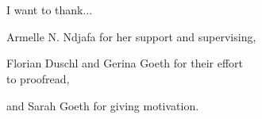 \chapter*{}
\begin{large}
\begin{em}

I want to thank...

\begin{addmargin}[4em]{1em}

Armelle N. Ndjafa for her support and supervising,

Florian Duschl and Gerina Goeth for their effort\\ to proofread,

and Sarah Goeth for giving motivation.
\end{addmargin}

\end{em}
\end{large}